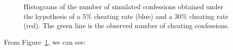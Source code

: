 \documentclass[
  letterpaper,
  DIV=11,
  numbers=noendperiod]{scrartcl}
\begin{document}
\begin{figure}[H]


\caption{\label{fig-cheating}Histograms of the number of simulated
confessions obtained under the hypothesis of a 5\% cheating rate (blue)
and a 30\% cheating rate (red). The green line is the observed number of
cheating confessions.}

\end{figure}%

From Figure~\ref{fig-cheating}, we can see:
\end{document}

